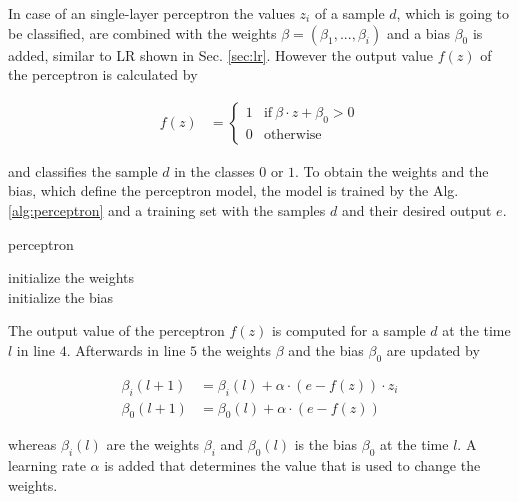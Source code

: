 In case of an single-layer perceptron the values $z_i$ of a sample $d$, which is going to be classified, are combined with the weights $\beta =(\beta_1, ..., \beta_i)$ and a bias $\beta_0$ is added, similar to \ac{LR} shown in Sec. \ref{sec:lr}.
However the output value $f(z)$ of the perceptron is calculated by

\begin{align*}
f(z) &= \begin{cases}
1 & \text{if}\ \beta \cdot z + \beta_0 > 0\\
0 & \text{otherwise}
\end{cases}
\end{align*}

and classifies the sample $d$ in the classes $0$ or $1$.
To obtain the weights and the bias, which define the perceptron model, the model is trained by the Alg. \ref{alg:perceptron} and a training set with the samples $d$ and their desired output $e$.

\SetAlCapHSkip{0.2em}
\begin{algorithm}[H]
\Indm
\SetAlgoLined
\caption{perceptron}
\label{alg:perceptron}
\Indp

initialize the weights\\ %
initialize the bias\\ %

\end{algorithm}

The output value of the perceptron $f(z)$ is computed for a sample $d$ at the time $l$ in line $4$.
Afterwards in line $5$ the weights $\beta$ and the bias $\beta_0$ are updated by

\begin{align*}
\beta_i(l+1) &= \beta_i(l) + \alpha \cdot (e - f(z)) \cdot z_i\\
\beta_0(l+1) &= \beta_0(l) + \alpha \cdot (e - f(z))
\end{align*}

whereas $\beta_i(l)$ are the weights $\beta_i$ and $\beta_0(l)$ is the bias $\beta_0$ at the time $l$.
A learning rate $\alpha$ is added that determines the value that is used to change the weights.

